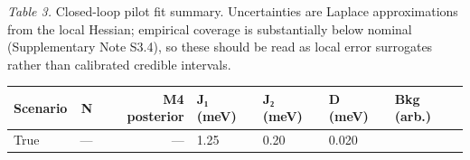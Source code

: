 \documentclass[
]{article}
\begin{document}
\emph{Table 3.} Closed-loop pilot fit summary. Uncertainties are Laplace
approximations from the local Hessian; empirical coverage is
substantially below nominal (Supplementary Note S3.4), so these should
be read as local error surrogates rather than calibrated credible
intervals.

\begin{longtable}[]{@{}lrrllll@{}}
\toprule
\begin{minipage}[b]{0.18\columnwidth}\raggedright
\textbf{Scenario}\strut
\end{minipage} & \begin{minipage}[b]{0.04\columnwidth}\raggedleft
\textbf{N}\strut
\end{minipage} & \begin{minipage}[b]{0.12\columnwidth}\raggedleft
\textbf{M4 posterior}\strut
\end{minipage} & \begin{minipage}[b]{0.11\columnwidth}\raggedright
\textbf{J₁ (meV)}\strut
\end{minipage} & \begin{minipage}[b]{0.11\columnwidth}\raggedright
\textbf{J₂ (meV)}\strut
\end{minipage} & \begin{minipage}[b]{0.13\columnwidth}\raggedright
\textbf{D (meV)}\strut
\end{minipage} & \begin{minipage}[b]{0.11\columnwidth}\raggedright
\textbf{Bkg (arb.)}\strut
\end{minipage}\tabularnewline
\midrule
\endhead
\begin{minipage}[t]{0.18\columnwidth}\raggedright
True\strut
\end{minipage} & \begin{minipage}[t]{0.04\columnwidth}\raggedleft
---\strut
\end{minipage} & \begin{minipage}[t]{0.12\columnwidth}\raggedleft
---\strut
\end{minipage} & \begin{minipage}[t]{0.11\columnwidth}\raggedright
1.25\strut
\end{minipage} & \begin{minipage}[t]{0.11\columnwidth}\raggedright
0.20\strut
\end{minipage} & \begin{minipage}[t]{0.13\columnwidth}\raggedright
0.020\strut
\end{minipage} & \begin{minipage}[t]{0.11\columnwidth}\raggedright

\end{minipage}
\end{longtable}
\end{document}
